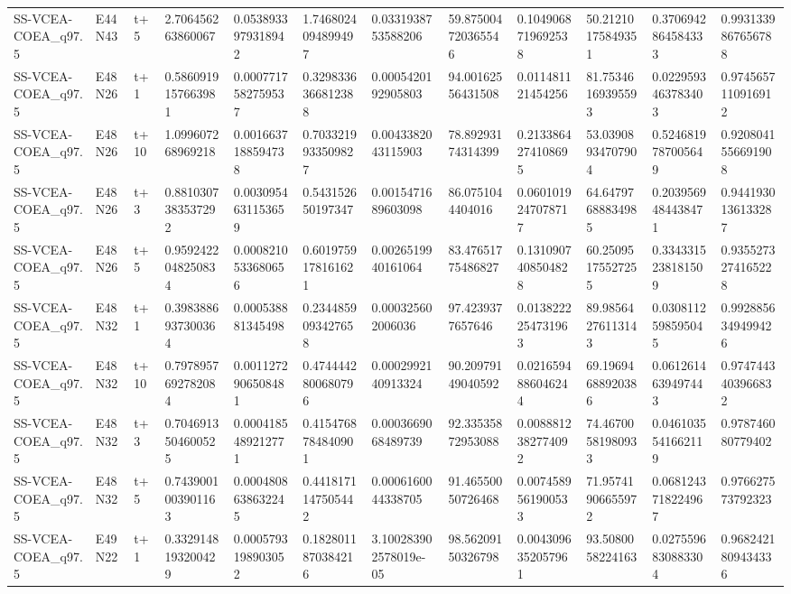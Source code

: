 \begin{landscape}
\begin{longtable}{llllllllllll}
SS-VCEA-COEA\_q97.5 & E44N43 & t+5 & 2.706456263860067 & 0.0538933979318942 & 1.7468024094899497 & 0.0331938753588206 & 59.875004720365546 & 0.1049068719692538 & 50.21210175849351 & 0.3706942864584333 & 0.9931339867656788 \\
SS-VCEA-COEA\_q97.5 & E48N26 & t+1 & 0.5860919157663981 & 0.0007717582759537 & 0.3298336366812388 & 0.0005420192905803 & 94.00162556431508 & 0.011481121454256 & 81.75346169395593 & 0.0229593463783403 & 0.9745657110916912 \\
SS-VCEA-COEA\_q97.5 & E48N26 & t+10 & 1.099607268969218 & 0.0016637188594738 & 0.7033219933509827 & 0.0043382043115903 & 78.89293174314399 & 0.2133864274108695 & 53.03908934707904 & 0.5246819787005649 & 0.9208041556691908 \\
SS-VCEA-COEA\_q97.5 & E48N26 & t+3 & 0.8810307383537292 & 0.0030954631153659 & 0.543152650197347 & 0.0015471689603098 & 86.0751044404016 & 0.0601019247078717 & 64.64797688834985 & 0.2039569484438471 & 0.9441930136133287 \\
SS-VCEA-COEA\_q97.5 & E48N26 & t+5 & 0.9592422048250834 & 0.0008210533680656 & 0.6019759178161621 & 0.0026519940161064 & 83.47651775486827 & 0.1310907408504828 & 60.25095175527255 & 0.3343315238181509 & 0.9355273274165228 \\
SS-VCEA-COEA\_q97.5 & E48N32 & t+1 & 0.3983886937300364 & 0.000538881345498 & 0.2344859093427658 & 0.000325602006036 & 97.4239377657646 & 0.0138222254731963 & 89.98564276113143 & 0.0308112598595045 & 0.9928856349499426 \\
SS-VCEA-COEA\_q97.5 & E48N32 & t+10 & 0.7978957692782084 & 0.0011272906508481 & 0.4744442800680796 & 0.0002992140913324 & 90.20979149040592 & 0.0216594886046244 & 69.19694688920386 & 0.0612614639497443 & 0.9747443403966832 \\
SS-VCEA-COEA\_q97.5 & E48N32 & t+3 & 0.7046913504600525 & 0.0004185489212771 & 0.4154768784840901 & 0.0003669068489739 & 92.33535872953088 & 0.0088812382774092 & 74.46700581980933 & 0.0461035541662119 & 0.978746080779402 \\
SS-VCEA-COEA\_q97.5 & E48N32 & t+5 & 0.7439001003901163 & 0.0004808638632245 & 0.4418171147505442 & 0.0006160044338705 & 91.46550050726468 & 0.0074589561900533 & 71.95741906655972 & 0.0681243718224967 & 0.976627573792323 \\
SS-VCEA-COEA\_q97.5 & E49N22 & t+1 & 0.3329148193200429 & 0.0005793198903052 & 0.1828011870384216 & 3.100283902578019e-05 & 98.56209150326798 & 0.0043096352057961 & 93.5080058224163 & 0.0275596830883304 & 0.9682421809434336 \\

\end{longtable}
\end{landscape}
